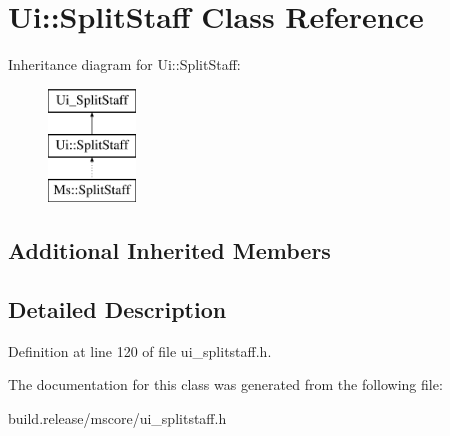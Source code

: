 \hypertarget{class_ui_1_1_split_staff}{}\section{Ui\+:\+:Split\+Staff Class Reference}
\label{class_ui_1_1_split_staff}
Inheritance diagram for Ui\+:\+:Split\+Staff\+:\begin{figure}[H]
\begin{center}
\leavevmode
\includegraphics[height=3.000000cm]{class_ui_1_1_split_staff}
\end{center}
\end{figure}
\subsection*{Additional Inherited Members}


\subsection{Detailed Description}


Definition at line 120 of file ui\+\_\+splitstaff.\+h.



The documentation for this class was generated from the following file\+:\begin{DoxyCompactItemize}
\item 
build.\+release/mscore/ui\+\_\+splitstaff.\+h\end{DoxyCompactItemize}
